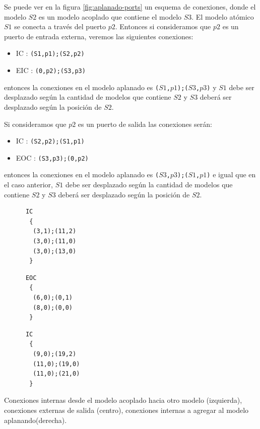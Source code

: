 \begin{itemize}
	Se puede ver en la figura \ref{fig:aplanado-ports} un esquema de conexiones, donde el modelo $S2$ es un modelo acoplado que contiene el modelo $S3$.
	 El modelo atómico $S1$ se conecta a través del puerto $p2$.
	 Entonces si consideramos que $p2$ es un puerto de entrada externa, veremos las siguientes conexiones:

	\begin{itemize}
	\item IC : \texttt{(S1,p1);(S2,p2)}
	\item EIC : \texttt{(0,p2);(S3,p3)}
	\end{itemize}

	entonces la conexiones en el modelo aplanado es \texttt{($S1$,$p1$);($S3$,$p3$)} y $S1$ debe ser desplazado según la cantidad de modelos que contiene $S2$ y 
	$S3$ deberá ser desplazado según la posición de $S2$.

	Si consideramos que $p2$ es un puerto de salida las conexiones serán:

	\begin{itemize}
	\item IC : \texttt{(S2,p2);(S1,p1)}
	\item EOC : \texttt{(S3,p3);(0,p2)}
	\end{itemize}

	entonces la conexiones en el modelo aplanado es \texttt{($S3$,$p3$);($S1$,$p1$)} e igual que en el caso anterior, $S1$ debe ser desplazado según la 
	cantidad de modelos que contiene $S2$ y $S3$ deberá ser desplazado según la posición de $S2$.


\begin{listing}
\begin{minipage}[t]{0.3\linewidth}
\begin{verbatim}
      IC
       {
        (3,1);(11,2)
        (3,0);(11,0)
        (3,0);(13,0)
       }
\end{verbatim}
\end{minipage}
\begin{minipage}[t]{0.3\linewidth}
\begin{verbatim}
      EOC
       {
        (6,0);(0,1)
        (8,0);(0,0)
       }
\end{verbatim}
\end{minipage}
\begin{minipage}[t]{0.3\linewidth}
\begin{verbatim}
      IC
       {
        (9,0);(19,2)
        (11,0);(19,0)
        (11,0);(21,0)
       }
\end{verbatim}
\end{minipage}
\label{lst:conexiones3}
\caption{Conexiones internas desde el modelo acoplado hacia otro modelo (izquierda), conexiones externas de salida (centro), conexiones internas a agregar al modelo aplanando(derecha).}
\end{listing}


\end{itemize}
